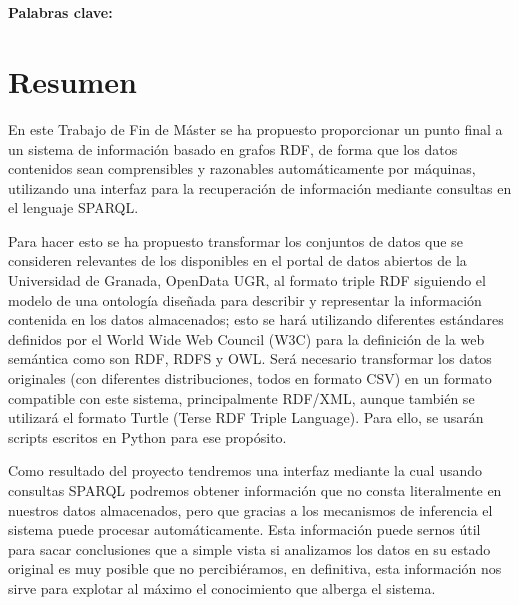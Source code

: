 \begin{center}
{\LARGE\bfseries\titulo}\\
\end{center}
\begin{center}
\autor\
\end{center}

\textbf{Palabras clave: }{\keywordsEs}

\section*{Resumen}

En este {\sf Trabajo de Fin de Máster} se ha propuesto proporcionar un punto final a un sistema de información basado en {\sf grafos RDF}, de forma que los datos contenidos sean comprensibles y razonables automáticamente por máquinas, utilizando una interfaz para la recuperación de información mediante consultas en el lenguaje {\sf SPARQL}. 

\bigskip
Para hacer esto se ha propuesto transformar los conjuntos de datos que se consideren relevantes de los disponibles en el portal de datos abiertos de la {\sf Universidad de Granada}, {\sf OpenData UGR}, al formato triple RDF siguiendo el modelo de una ontología diseñada para describir y representar la información contenida en los datos almacenados; esto se hará utilizando diferentes estándares definidos por el {\sf World Wide Web Council (W3C)} para la definición de la web semántica como son {\sf RDF}, {\sf RDFS} y {\sf OWL}. Será necesario transformar los datos originales (con diferentes distribuciones, todos en formato {\sf CSV}) en un formato compatible con este sistema, principalmente {\sf RDF/XML}, aunque también se utilizará el formato {\sf Turtle (Terse RDF Triple Language)}. Para ello, se usarán scripts escritos en {\sf Python} para ese propósito.

\bigskip
Como resultado del proyecto tendremos una interfaz mediante la cual usando consultas {\sf SPARQL} podremos obtener información que no consta literalmente en nuestros datos almacenados, pero que gracias a los mecanismos de inferencia el sistema puede procesar automáticamente. Esta información puede sernos útil para sacar conclusiones que a simple vista si analizamos los datos en su estado original es muy posible que no percibiéramos, en definitiva, esta información nos sirve para explotar al máximo el conocimiento que alberga el sistema.

\newpage
\begin{center}
{\LARGE\bfseries\tituloEng}\\
\end{center}
\begin{center}
\autor\
\end{center}

